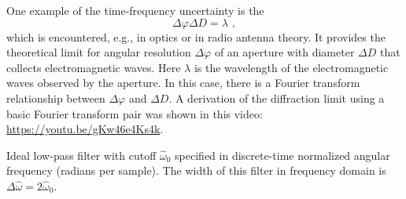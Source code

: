 One example of the time-frequency uncertainty is the \emph{}
\begin{equation}
  \Delta \varphi \Delta D=\lambda \,\,,
\end{equation}
which is encountered, e.g., in optics or in radio antenna theory. It
provides the theoretical limit for angular resolution $\Delta \varphi$
of an aperture with diameter $\Delta D$ that collects electromagnetic
waves. Here $\lambda$ is the wavelength of the electromagnetic waves
observed by the aperture. In this case, there is a Fourier transform
relationship between $\Delta \varphi$ and $\Delta D$. A derivation of
the diffraction limit using a basic Fourier transform pair was shown
in this video: \url{https://youtu.be/gKw46e4Ks4k}.



\begin{marginfigure}[-5cm]
  \begin{center}
  \end{center}
  \caption{Ideal low-pass filter with cutoff $\hat{\omega}_0$ specified in discrete-time
    normalized angular frequency (radians per sample).
    The width of this filter in frequency domain is $\Delta \hat{\omega} = 2\hat{\omega}_0$.}
  \label{fig:ideal_lpf}
\end{marginfigure}

